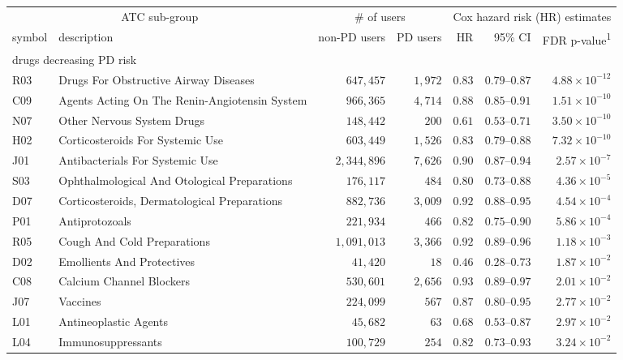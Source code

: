 \setlength{\LTpost}{0mm}
\begin{longtable}{llrrrrr}
\toprule
\multicolumn{2}{c}{ATC sub-group} & \multicolumn{2}{c}{\# of users} & \multicolumn{3}{c}{Cox hazard risk (HR) estimates} \\ 
\cmidrule(lr){1-2} \cmidrule(lr){3-4} \cmidrule(lr){5-7}
symbol & description & non-PD users & PD users & HR & 95\% CI & FDR p-value\textsuperscript{1} \\ 
\midrule
\multicolumn{7}{l}{drugs decreasing PD risk} \\ 
\midrule
R03 & Drugs For Obstructive Airway Diseases & $647,457$ & $1,972$ & $0.83$ & $0.79$–$0.87$ & $4.88 \times 10^{-12}$ \\ 
C09 & Agents Acting On The Renin-Angiotensin System & $966,365$ & $4,714$ & $0.88$ & $0.85$–$0.91$ & $1.51 \times 10^{-10}$ \\ 
N07 & Other Nervous System Drugs & $148,442$ & $200$ & $0.61$ & $0.53$–$0.71$ & $3.50 \times 10^{-10}$ \\ 
H02 & Corticosteroids For Systemic Use & $603,449$ & $1,526$ & $0.83$ & $0.79$–$0.88$ & $7.32 \times 10^{-10}$ \\ 
J01 & Antibacterials For Systemic Use & $2,344,896$ & $7,626$ & $0.90$ & $0.87$–$0.94$ & $2.57 \times 10^{-7}$ \\ 
S03 & Ophthalmological And Otological Preparations & $176,117$ & $484$ & $0.80$ & $0.73$–$0.88$ & $4.36 \times 10^{-5}$ \\ 
D07 & Corticosteroids, Dermatological Preparations & $882,736$ & $3,009$ & $0.92$ & $0.88$–$0.95$ & $4.54 \times 10^{-4}$ \\ 
P01 & Antiprotozoals & $221,934$ & $466$ & $0.82$ & $0.75$–$0.90$ & $5.86 \times 10^{-4}$ \\ 
R05 & Cough And Cold Preparations & $1,091,013$ & $3,366$ & $0.92$ & $0.89$–$0.96$ & $1.18 \times 10^{-3}$ \\ 
D02 & Emollients And Protectives & $41,420$ & $18$ & $0.46$ & $0.28$–$0.73$ & $1.87 \times 10^{-2}$ \\ 
C08 & Calcium Channel Blockers & $530,601$ & $2,656$ & $0.93$ & $0.89$–$0.97$ & $2.01 \times 10^{-2}$ \\ 
J07 & Vaccines & $224,099$ & $567$ & $0.87$ & $0.80$–$0.95$ & $2.77 \times 10^{-2}$ \\ 
L01 & Antineoplastic Agents & $45,682$ & $63$ & $0.68$ & $0.53$–$0.87$ & $2.97 \times 10^{-2}$ \\ 
L04 & Immunosuppressants & $100,729$ & $254$ & $0.82$ & $0.73$–$0.93$ & $3.24 \times 10^{-2}$ \\ 

\end{longtable}
